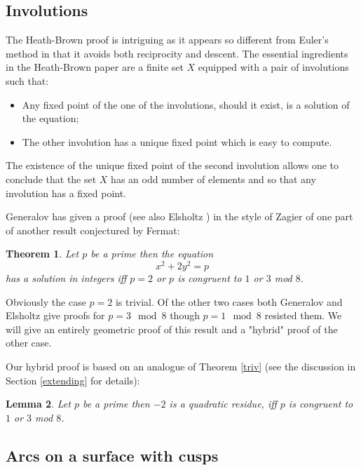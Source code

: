 \documentclass[12pt,a4paper]{amsart}
\newtheorem{thm}{Theorem}[section]
\newtheorem{lem}[thm]{Lemma}
\begin{document}
\subsection{Involutions}

The Heath-Brown proof is intriguing as it appears so different from
Euler's method in that it avoids both reciprocity and descent.
The essential ingredients in the Heath-Brown paper are
a finite set $X$ equipped with a pair of involutions such that:


\begin{itemize}
	\item Any fixed point of the one of the involutions,
		should it exist, is a solution of the equation;
	\item The other involution has a unique fixed point which is easy to compute.
\end{itemize}

The existence of the unique fixed point of the second involution
allows one to conclude that the set $X$ has an odd number of elements
and so that any involution has a fixed point.


Generalov \cite{generalov} has given a proof (see also Elsholtz \cite{elsholtz}) in the style of Zagier of one part of
another result conjectured by Fermat:

\begin{thm}\label{case m equals 2}
Let $p$ be a prime then the equation
$$x^2 + 2y^2 = p $$
has a solution in integers  
iff  $p =2$ or $p$ is congruent to $1$ or $3$ mod $8$.
\end{thm}

\noindent
Obviously the case $p=2$ is trivial.
Of the other two cases 
both Generalov and Elsholtz give proofs for $p = 3 \mod 8$ 
though $p=1 \mod 8$ resisted them.
We will give an entirely geometric proof of this result and a
"hybrid" proof of the other case.

Our hybrid proof is based on an analogue of Theorem \ref{triv} (see
the discussion in Section \ref{extending} for details):

\begin{lem}\label{analogue for -2}
Let $p$ be a prime then 
$-2$ is a quadratic residue, 
iff  $p$ is congruent to $1$ or $3$ mod $8$.
\end{lem}


\subsection{Arcs on a surface with cusps}
\end{document}
